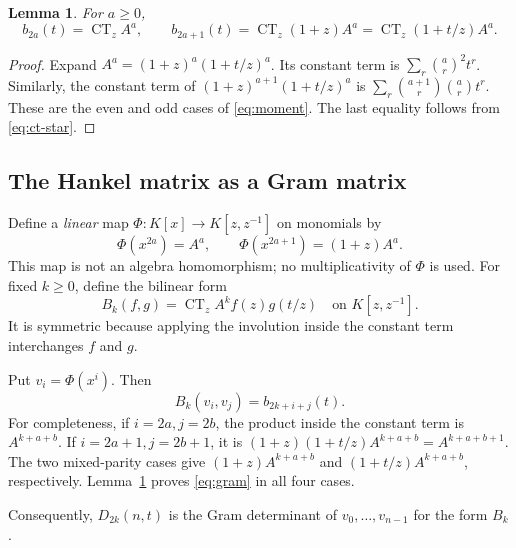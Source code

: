 \documentclass[11pt,a4paper]{article}
\newtheorem{lemma}[theorem]{Lemma}
\theoremstyle{definition}
\theoremstyle{remark}
\newcommand{\CT}{\operatorname{CT}_z}
\numberwithin{equation}{section}
\begin{document}
\begin{lemma}
\label{lem:moments}
For \(a\ge0\),
\begin{equation}
 b_{2a}(t)=\CT A^a,\qquad
 b_{2a+1}(t)=\CT(1+z)A^a
            =\CT(1+t/z)A^a.
 \label{eq:ct-moments}
\end{equation}
\end{lemma}
\begin{proof}
Expand \(A^a=(1+z)^a(1+t/z)^a\). Its constant term is
\(\sum_r\binom ar^2t^r\). Similarly, the constant term of
\((1+z)^{a+1}(1+t/z)^a\) is
\(\sum_r\binom{a+1}{r}\binom ar t^r\). These are the even and odd cases
of \eqref{eq:moment}. The last equality follows from
\eqref{eq:ct-star}.
\end{proof}

\subsection{The Hankel matrix as a Gram matrix}
Define a \emph{linear} map \(\Phi:K[x]\to K[z,z^{-1}]\) on monomials by
\begin{equation}
 \Phi(x^{2a})=A^a,\qquad
 \Phi(x^{2a+1})=(1+z)A^a.
 \label{eq:Phi}
\end{equation}
This map is not an algebra homomorphism; no multiplicativity of \(\Phi\)
is used. For fixed \(k\ge0\), define the bilinear form
\begin{equation}
 B_k(f,g)=\CT A^k f(z)g(t/z)
 \quad\text{on }K[z,z^{-1}].
 \label{eq:form}
\end{equation}
It is symmetric because applying the involution inside the constant term
interchanges \(f\) and \(g\).

Put \(v_i=\Phi(x^i)\). Then
\begin{equation}
 B_k(v_i,v_j)=b_{2k+i+j}(t).
 \label{eq:gram}
\end{equation}
For completeness, if \(i=2a,j=2b\), the product inside the constant term
is \(A^{k+a+b}\). If \(i=2a+1,j=2b+1\), it is
\((1+z)(1+t/z)A^{k+a+b}=A^{k+a+b+1}\). The two mixed-parity cases give
\((1+z)A^{k+a+b}\) and \((1+t/z)A^{k+a+b}\), respectively. Lemma~\ref{lem:moments}
proves \eqref{eq:gram} in all four cases.

Consequently, \(D_{2k}(n,t)\) is the Gram determinant of
\(v_0,\ldots,v_{n-1}\) for the form \(B_k\).
\end{document}
